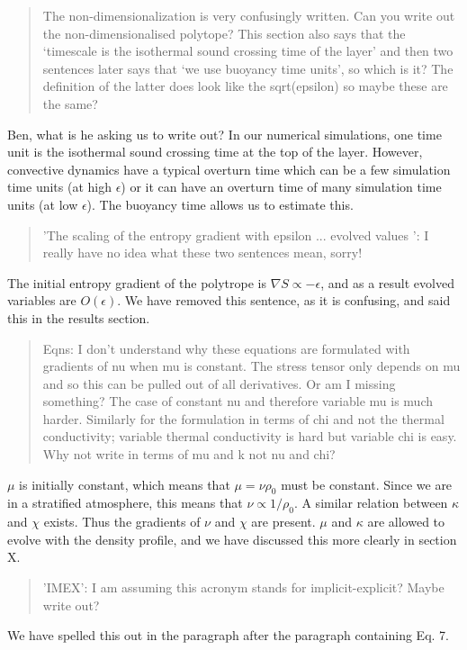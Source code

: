 \documentclass[aps, 11pt, singlecolumn]{revtex4-1} %
\begin{document}
\begin{singlespace}
\begin{quotation}
The non-dimensionalization is very confusingly written. Can you write
out the non-dimensionalised polytope? This section also says that the
`timescale is the isothermal sound crossing time of the layer'
and then two sentences later says that `we use buoyancy time
units', so which is it? The definition of the latter does look like
the sqrt(epsilon) so maybe these are the same?
\end{quotation}
Ben, what is he asking us to write out?
In our numerical simulations, one time unit is the isothermal sound
crossing time at the top of the layer.  However, convective dynamics
have a typical overturn time which can be a few simulation time units
(at high $\epsilon$) or it can have an overturn time of many simulation
time units (at low $\epsilon$).  The buoyancy time allows us to estimate this.

\begin{quotation}
'The scaling of the entropy gradient with epsilon ... evolved
values ': I really have no idea what these two sentences mean,
sorry!
\end{quotation}
The initial entropy gradient of the polytrope is $\nabla S \propto -\epsilon$,
and as a result evolved variables are $O(\epsilon)$.  We have removed this
sentence, as it is confusing, and said this in the results section.

\begin{quotation}
Eqns: I don't understand why these equations are formulated with
gradients of nu when mu is constant. The stress tensor only depends on
mu and so this can be pulled out of all derivatives. Or am I missing
something? The case of constant nu and therefore variable mu is much
harder. Similarly for the formulation in terms of chi and not the
thermal conductivity; variable thermal conductivity is hard but
variable chi is easy. Why not write in terms of mu and k not nu and
chi?
\end{quotation}
$\mu$ is initially constant, which means that $\mu = \nu\rho_0$
must be constant.  Since we are in a stratified atmosphere, this
means that $\nu \propto 1/\rho_0$.  A similar relation between
$\kappa$ and $\chi$ exists.  Thus the gradients of $\nu$ and $\chi$
are present.  $\mu$ and $\kappa$ are allowed to evolve with the
density profile, and we have discussed this more clearly in section X.

\begin{quotation}
'IMEX': I am assuming this acronym stands for implicit-explicit?
Maybe write out?
\end{quotation}
We have spelled this out in the paragraph after the paragraph
containing Eq. 7.


\end{singlespace}
\end{document}
